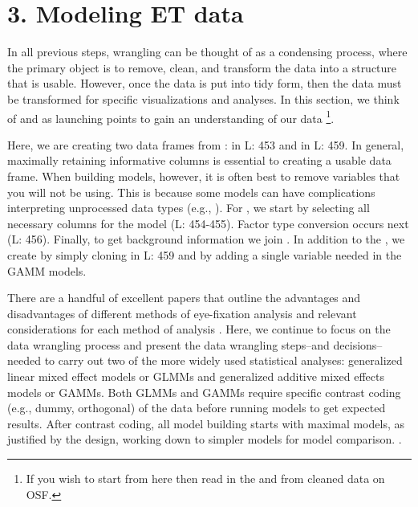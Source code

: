 \section{3. Modeling ET data}

In all previous steps, wrangling can be thought of as a condensing process, where the primary object is to remove, clean, and transform the data into a structure that is usable. However, once the data is put into tidy form, then the data must be transformed for specific visualizations and analyses. In this section, we think of  and  as launching points to gain an understanding of our data \footnote{If you wish to start from here then read in the  and  from cleaned data on OSF.}.

 Here, we are creating two data frames from :  in L: 453 and  in L: 459. In general, maximally retaining informative columns is essential to creating a usable data frame. When building models, however, it is often best to remove variables that you will not be using. This is because some models can have complications interpreting unprocessed data types (e.g., ). For , we start by selecting all necessary columns for the model (L: 454-455). Factor type conversion occurs next (L: 456). Finally, to get background information we join . In addition to the , we create  by simply cloning  in L: 459 and by adding a single variable needed in the GAMM models.



There are a handful of excellent papers that outline the advantages and disadvantages of different methods of eye-fixation analysis and relevant considerations for each method of analysis \parencite{Ito_Knoeferle_2022,Mirman_Dixon_Magnuson_2008,McMurray_2023,Barr_2008}. Here, we continue to focus on the data wrangling process and present the data wrangling steps--and decisions--needed to carry out two of the more widely used statistical analyses: generalized linear mixed effect models or GLMMs and generalized additive mixed effects models or GAMMs. Both GLMMs and GAMMs require specific contrast coding (e.g., dummy, orthogonal) of the data before running models to get expected results.  After contrast coding, all model building starts with maximal models, as justified by the design, working down to simpler models for model comparison. \parencite{Barr_Levy_Scheepers_Tily_2013}.
\newline
